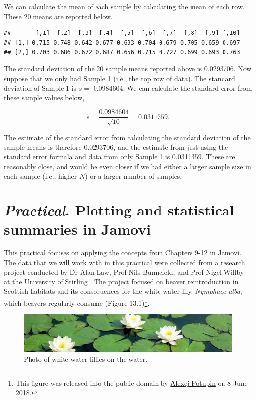 \documentclass[
]{scrbook}
\begin{document}
We can calculate the mean of each sample by calculating the mean of each row.
These 20 means are reported below.

\begin{verbatim}
##       [,1]  [,2]  [,3]  [,4]  [,5]  [,6]  [,7]  [,8]  [,9] [,10]
## [1,] 0.715 0.748 0.642 0.677 0.693 0.704 0.679 0.705 0.659 0.697
## [2,] 0.703 0.686 0.672 0.687 0.656 0.715 0.727 0.699 0.693 0.763
\end{verbatim}

The standard deviation of the 20 sample means reported above is 0.0293706.
Now suppose that we only had Sample 1 (i.e., the top row of data).
The standard deviation of Sample 1 is \(s =\) 0.0984604.
We can calculate the standard error from these sample values below,

\[s = \frac{0.0984604}{\sqrt{10}} = 0.0311359.\]

The estimate of the standard error from calculating the standard deviation of the sample means is therefore 0.0293706, and the estimate from just using the standard error formula and data from only Sample 1 is 0.0311359.
These are reasonably close, and would be even closer if we had either a larger sample size in each sample (i.e., higher \(N\)) or a larger number of samples.

\hypertarget{Chapter_13}{%
\chapter{\texorpdfstring{\emph{Practical}. Plotting and statistical summaries in Jamovi}{Practical. Plotting and statistical summaries in Jamovi}}\label{Chapter_13}}

This practical focuses on applying the concepts from Chapters 9-12 in Jamovi.
The data that we will work with in this practical were collected from a research project conducted by Dr Alan Law, Prof Nils Bunnefeld, and Prof Nigel Willby at the University of Stirling \citep{Law2014}.
The project focused on beaver reintroduction in Scottish habitats and its consequences for the white water lily, \emph{Nymphaea alba}, which beavers regularly consume (Figure 13.1)\footnote{This figure was released into the public domain by \href{https://commons.wikimedia.org/wiki/File:Nymphaea_alba._Reader.jpg}{Аlexej Potupin} on 8 June 2018.}.

\begin{figure}
\includegraphics[width=1\linewidth]{img/Nymphaea_alba_pads} \caption{Photo of white water lillies on the water.}\label{fig:unnamed-chunk-43}
\end{figure}
\end{document}
